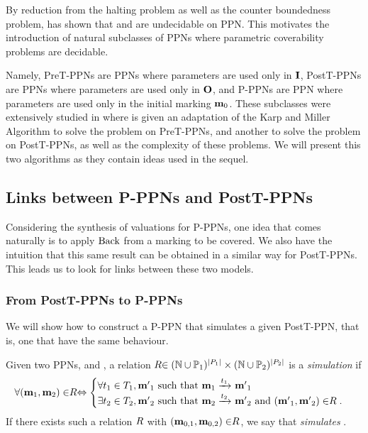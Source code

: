 \label{sec:preliminaries-ppn}

By reduction from the halting problem as well as the counter boundedness problem, \cite{David17} has shown that \Ucov and \Ecov are undecidable on \ac{PPN}.
This motivates the introduction of natural subclasses of \acp{PPN} where parametric coverability problems are decidable.

Namely,
PreT-PPNs are \acp{PPN} where parameters are used only in $\mathbf{I}$,
PostT-PPNs are \acp{PPN} where parameters are used only in $\mathbf{O}$,
and P-PPNs are \ac{PPN} where parameters are used only in the initial marking $\mathbf{m}_0$.
These subclasses were extensively studied in \cite{David17} where is given
an adaptation of the Karp and Miller Algorithm to solve the \Ucov problem on PreT-\acp{PPN}, and another to solve the \Ecov problem on PostT-\acp{PPN}, as well as the complexity of these problems.
We will present this two algorithms as they contain ideas used in the sequel.

\subsection{Links between P-PPNs and PostT-PPNs}

Considering the synthesis of valuations for P-PPNs, one idea that comes naturally is to apply $\operatorname{Back}$ from a marking to be covered.
We also have the intuition that this same result can be obtained in a similar way for PostT-PPNs. 
This leads us to look for links between these two models.

\subsubsection{From PostT-PPNs to P-PPNs}

We will show how to construct a P-PPN that simulates a given PostT-PPN, that is, one that have the same behaviour.

\begin{defi}
  Given two \acp{PPN}, \SPTPmi and \SPTPmii, a relation $\mathrel{R} \in (\mathbb{N} \cup  \mathbb{P}_1)^{|P_1|} \times (\mathbb{N} \cup  \mathbb{P}_2)^{|P_2|}$ is a \emph{simulation} if
  \[
    \forall (\mathbf{m}_1, \mathbf{m}_2) \in \mathrel{R} \Leftrightarrow
    \begin{cases}
      \forall t_1 \in T_1, \mathbf{m'}_1 \text{ such that } \mathbf{m}_1 \xrightarrow{t_1}_{} \mathbf{m'}_1 \\
      \exists t_2 \in T_2, \mathbf{m'}_2 \text{ such that } \mathbf{m}_2 \xrightarrow{t_2}_{} \mathbf{m'}_2
        \text{ and } (\mathbf{m'}_1, \mathbf{m'}_2) \in \mathrel{R}.
    \end{cases}
  \]
  If there exists such a relation $\mathrel{R}$ with $(\mathbf{m}_{0,1}, \mathbf{m}_{0,2}) \in \mathrel{R}$, we say that \PPNii \emph{simulates} \PPNi.
\end{defi}

